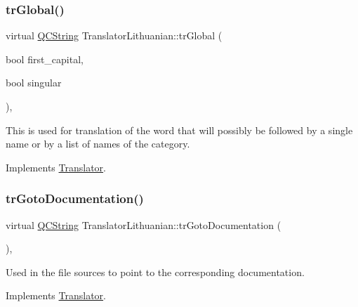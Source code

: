 \mbox{\label{class_translator_lithuanian_aa3b9712b1eef1d654bfd4f498bdc177d}} 
\subsubsection{\texorpdfstring{trGlobal()}{trGlobal()}}
{\footnotesize\ttfamily virtual \mbox{\hyperlink{class_q_c_string}{Q\+C\+String}} Translator\+Lithuanian\+::tr\+Global (\begin{DoxyParamCaption}\item[{bool}]{first\+\_\+capital,  }\item[{bool}]{singular }\end{DoxyParamCaption})\hspace{0.3cm}{\ttfamily [inline]}, {\ttfamily [virtual]}}

This is used for translation of the word that will possibly be followed by a single name or by a list of names of the category. 

Implements \mbox{\hyperlink{class_translator}{Translator}}.

\mbox{\label{class_translator_lithuanian_ad6c40eef321cc7020608fca6a0f92269}} 
\subsubsection{\texorpdfstring{trGotoDocumentation()}{trGotoDocumentation()}}
{\footnotesize\ttfamily virtual \mbox{\hyperlink{class_q_c_string}{Q\+C\+String}} Translator\+Lithuanian\+::tr\+Goto\+Documentation (\begin{DoxyParamCaption}{ }\end{DoxyParamCaption})\hspace{0.3cm}{\ttfamily [inline]}, {\ttfamily [virtual]}}

Used in the file sources to point to the corresponding documentation. 

Implements \mbox{\hyperlink{class_translator}{Translator}}.

\mbox{\label{class_translator_lithuanian_a1ae3a061356a1109fdd0bbbc48813089}} 
